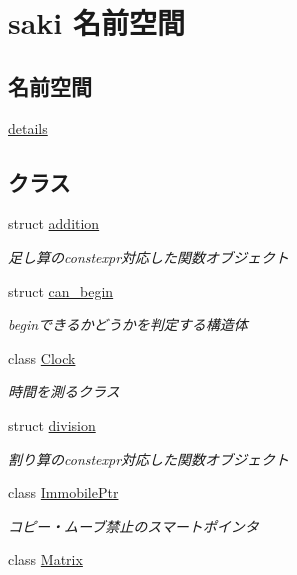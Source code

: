 \hypertarget{namespacesaki}{}\section{saki 名前空間}
\label{namespacesaki}
\subsection*{名前空間}
\begin{DoxyCompactItemize}
\item 
 \mbox{\hyperlink{namespacesaki_1_1details}{details}}
\end{DoxyCompactItemize}
\subsection*{クラス}
\begin{DoxyCompactItemize}
\item 
struct \mbox{\hyperlink{structsaki_1_1addition}{addition}}
\begin{DoxyCompactList}\small\item\em 足し算のconstexpr対応した関数オブジェクト \end{DoxyCompactList}\item 
struct \mbox{\hyperlink{structsaki_1_1can__begin}{can\+\_\+begin}}
\begin{DoxyCompactList}\small\item\em beginできるかどうかを判定する構造体 \end{DoxyCompactList}\item 
class \mbox{\hyperlink{classsaki_1_1_clock}{Clock}}
\begin{DoxyCompactList}\small\item\em 時間を測るクラス \end{DoxyCompactList}\item 
struct \mbox{\hyperlink{structsaki_1_1division}{division}}
\begin{DoxyCompactList}\small\item\em 割り算のconstexpr対応した関数オブジェクト \end{DoxyCompactList}\item 
class \mbox{\hyperlink{classsaki_1_1_immobile_ptr}{Immobile\+Ptr}}
\begin{DoxyCompactList}\small\item\em コピー・ムーブ禁止のスマートポインタ \end{DoxyCompactList}\item 
class \mbox{\hyperlink{classsaki_1_1_matrix}{Matrix}}

\end{DoxyCompactItemize}

